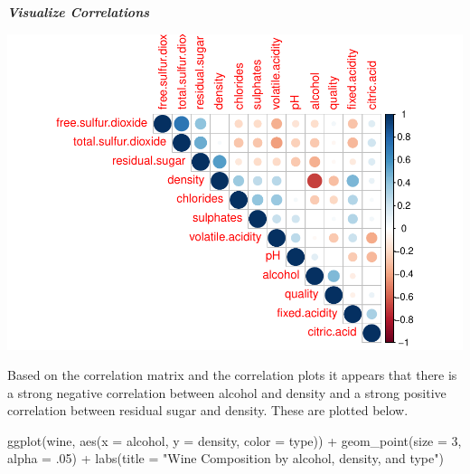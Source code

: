 \documentclass[
]{book}
\newenvironment{Shaded}{\begin{snugshade}}{\end{snugshade}}
\newcommand{\AttributeTok}[1]{\textcolor[rgb]{0.77,0.63,0.00}{#1}}
\newcommand{\CommentTok}[1]{\textcolor[rgb]{0.56,0.35,0.01}{\textit{#1}}}
\newcommand{\DecValTok}[1]{\textcolor[rgb]{0.00,0.00,0.81}{#1}}
\newcommand{\FloatTok}[1]{\textcolor[rgb]{0.00,0.00,0.81}{#1}}
\newcommand{\FunctionTok}[1]{\textcolor[rgb]{0.00,0.00,0.00}{#1}}
\newcommand{\NormalTok}[1]{#1}
\newcommand{\SpecialCharTok}[1]{\textcolor[rgb]{0.00,0.00,0.00}{#1}}
\newcommand{\StringTok}[1]{\textcolor[rgb]{0.31,0.60,0.02}{#1}}
\begin{document}
\textbf{\emph{Visualize Correlations}}

\begin{Shaded}
\end{Shaded}

\includegraphics{FinalProject-Bright-Santoro_files/figure-latex/unnamed-chunk-7-1.pdf}

Based on the correlation matrix and the correlation plots it appears that there is a strong negative correlation between alcohol and density and a strong positive correlation between residual sugar and density. These are plotted below.

\begin{Shaded}
\begin{Highlighting}[]
\FunctionTok{ggplot}\NormalTok{(wine, }
       \FunctionTok{aes}\NormalTok{(}\AttributeTok{x =}\NormalTok{ alcohol, }
           \AttributeTok{y =}\NormalTok{ density, }
           \AttributeTok{color =}\NormalTok{ type)) }\SpecialCharTok{+}
  \FunctionTok{geom\_point}\NormalTok{(}\AttributeTok{size =} \DecValTok{3}\NormalTok{, }
             \AttributeTok{alpha =}\NormalTok{ .}\DecValTok{05}\NormalTok{) }\SpecialCharTok{+}
  \FunctionTok{labs}\NormalTok{(}\AttributeTok{title =} \StringTok{"Wine Composition by alcohol, density, and type"}\NormalTok{)}
\end{Highlighting}
\end{Shaded}
\end{document}
